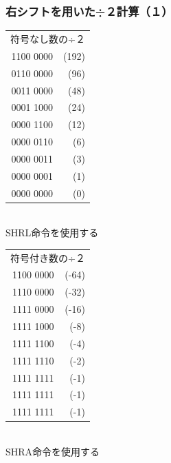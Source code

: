 \documentclass{beamer}                 %
\begin{document}
\begin{frame}
  \frametitle{右シフトを用いた÷２計算（１）}
  \begin{minipage}{0.48\columnwidth}
    \begin{center}
      {\ttfamily%
        \begin{tabular}{r r}
          \multicolumn{2}{c}{符号なし数の÷２} \\
          1100 0000 & (192) \\ %
          0110 0000 & (96)  \\ %
          0011 0000 & (48)  \\ %
          0001 1000 & (24)  \\ %
          0000 1100 & (12)  \\ %
          0000 0110 & (6)   \\
          0000 0011 & (3)   \\
          0000 0001 & (1)   \\
          0000 0000 & (0)   \\
        \end{tabular}
      }\\
      \vspace{0.5cm}
      SHRL命令を使用する
    \end{center}
  \end{minipage}
  \begin{minipage}{0.48\columnwidth}
    \begin{center}
      {\ttfamily%
        \begin{tabular}{r r}
          \multicolumn{2}{c}{符号付き数の÷２} \\
          1100 0000 & (-64) \\
          1110 0000 & (-32) \\
          1111 0000 & (-16) \\
          1111 1000 & (-8)  \\
          1111 1100 & (-4)  \\
          1111 1110 & (-2)  \\
          1111 1111 & (-1) \\
          1111 1111 & (-1) \\
          1111 1111 & (-1) \\
        \end{tabular}
      }\\
      \vspace{0.5cm}
      SHRA命令を使用する
    \end{center}
  \end{minipage}
  \vfill
\end{frame}
\end{document}
